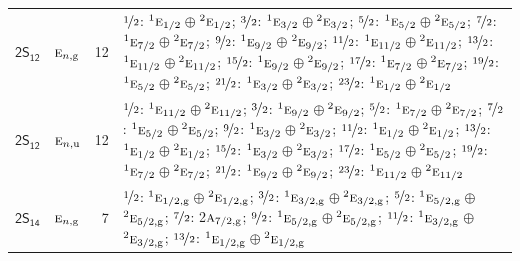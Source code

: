 \documentclass[10pt,a4paper]{article}
\numberwithin{equation}{section}
\newcommand{\grp}[1]{\mathsf{#1}}
\newcommand{\irr}[1]{\text{\normalfont\scshape #1}}
\newcommand{\conjpair}[1]{{}^{#1}}
\newcommand{\ptag}[1]{\mathrm{#1}}
\newlength{\fillwidth}\newlength{\cellwidth}\newlength{\colwidth}
\begin{document}
{\begin{longtable}{@{}llr>{\RaggedRight\arraybackslash}p{\fillwidth}@{}}
\href{2S12.pdf}{$\grp{2S_{12}}$} & $\irr{e}_{n,\ptag{g}}$ & 12 & $\nicefrac{1}{2}$: $\conjpair{1}\irr{e}_{1/2}$${}\oplus{}$$\conjpair{2}\irr{e}_{1/2}$; $\nicefrac{3}{2}$: $\conjpair{1}\irr{e}_{3/2}$${}\oplus{}$$\conjpair{2}\irr{e}_{3/2}$; $\nicefrac{5}{2}$: $\conjpair{1}\irr{e}_{5/2}$${}\oplus{}$$\conjpair{2}\irr{e}_{5/2}$; $\nicefrac{7}{2}$: $\conjpair{1}\irr{e}_{7/2}$${}\oplus{}$$\conjpair{2}\irr{e}_{7/2}$; $\nicefrac{9}{2}$: $\conjpair{1}\irr{e}_{9/2}$${}\oplus{}$$\conjpair{2}\irr{e}_{9/2}$; $\nicefrac{11}{2}$: $\conjpair{1}\irr{e}_{11/2}$${}\oplus{}$$\conjpair{2}\irr{e}_{11/2}$; $\nicefrac{13}{2}$: $\conjpair{1}\irr{e}_{11/2}$${}\oplus{}$$\conjpair{2}\irr{e}_{11/2}$; $\nicefrac{15}{2}$: $\conjpair{1}\irr{e}_{9/2}$${}\oplus{}$$\conjpair{2}\irr{e}_{9/2}$; $\nicefrac{17}{2}$: $\conjpair{1}\irr{e}_{7/2}$${}\oplus{}$$\conjpair{2}\irr{e}_{7/2}$; $\nicefrac{19}{2}$: $\conjpair{1}\irr{e}_{5/2}$${}\oplus{}$$\conjpair{2}\irr{e}_{5/2}$; $\nicefrac{21}{2}$: $\conjpair{1}\irr{e}_{3/2}$${}\oplus{}$$\conjpair{2}\irr{e}_{3/2}$; $\nicefrac{23}{2}$: $\conjpair{1}\irr{e}_{1/2}$${}\oplus{}$$\conjpair{2}\irr{e}_{1/2}$\\
\href{2S12.pdf}{$\grp{2S_{12}}$} & $\irr{e}_{n,\ptag{u}}$ & 12 & $\nicefrac{1}{2}$: $\conjpair{1}\irr{e}_{11/2}$${}\oplus{}$$\conjpair{2}\irr{e}_{11/2}$; $\nicefrac{3}{2}$: $\conjpair{1}\irr{e}_{9/2}$${}\oplus{}$$\conjpair{2}\irr{e}_{9/2}$; $\nicefrac{5}{2}$: $\conjpair{1}\irr{e}_{7/2}$${}\oplus{}$$\conjpair{2}\irr{e}_{7/2}$; $\nicefrac{7}{2}$: $\conjpair{1}\irr{e}_{5/2}$${}\oplus{}$$\conjpair{2}\irr{e}_{5/2}$; $\nicefrac{9}{2}$: $\conjpair{1}\irr{e}_{3/2}$${}\oplus{}$$\conjpair{2}\irr{e}_{3/2}$; $\nicefrac{11}{2}$: $\conjpair{1}\irr{e}_{1/2}$${}\oplus{}$$\conjpair{2}\irr{e}_{1/2}$; $\nicefrac{13}{2}$: $\conjpair{1}\irr{e}_{1/2}$${}\oplus{}$$\conjpair{2}\irr{e}_{1/2}$; $\nicefrac{15}{2}$: $\conjpair{1}\irr{e}_{3/2}$${}\oplus{}$$\conjpair{2}\irr{e}_{3/2}$; $\nicefrac{17}{2}$: $\conjpair{1}\irr{e}_{5/2}$${}\oplus{}$$\conjpair{2}\irr{e}_{5/2}$; $\nicefrac{19}{2}$: $\conjpair{1}\irr{e}_{7/2}$${}\oplus{}$$\conjpair{2}\irr{e}_{7/2}$; $\nicefrac{21}{2}$: $\conjpair{1}\irr{e}_{9/2}$${}\oplus{}$$\conjpair{2}\irr{e}_{9/2}$; $\nicefrac{23}{2}$: $\conjpair{1}\irr{e}_{11/2}$${}\oplus{}$$\conjpair{2}\irr{e}_{11/2}$\\
\href{2S14.pdf}{$\grp{2S_{14}}$} & $\irr{e}_{n,\ptag{g}}$ & 7 & $\nicefrac{1}{2}$: $\conjpair{1}\irr{e}_{1/2,\ptag{g}}$${}\oplus{}$$\conjpair{2}\irr{e}_{1/2,\ptag{g}}$; $\nicefrac{3}{2}$: $\conjpair{1}\irr{e}_{3/2,\ptag{g}}$${}\oplus{}$$\conjpair{2}\irr{e}_{3/2,\ptag{g}}$; $\nicefrac{5}{2}$: $\conjpair{1}\irr{e}_{5/2,\ptag{g}}$${}\oplus{}$$\conjpair{2}\irr{e}_{5/2,\ptag{g}}$; $\nicefrac{7}{2}$: 2$\irr{a}_{7/2,\ptag{g}}$; $\nicefrac{9}{2}$: $\conjpair{1}\irr{e}_{5/2,\ptag{g}}$${}\oplus{}$$\conjpair{2}\irr{e}_{5/2,\ptag{g}}$; $\nicefrac{11}{2}$: $\conjpair{1}\irr{e}_{3/2,\ptag{g}}$${}\oplus{}$$\conjpair{2}\irr{e}_{3/2,\ptag{g}}$; $\nicefrac{13}{2}$: $\conjpair{1}\irr{e}_{1/2,\ptag{g}}$${}\oplus{}$$\conjpair{2}\irr{e}_{1/2,\ptag{g}}$\\

\end{longtable}}
\end{document}
